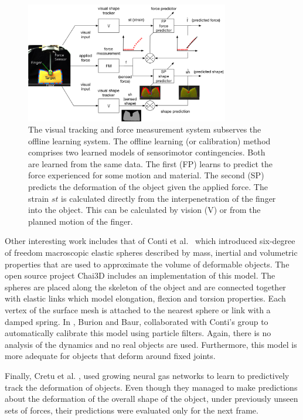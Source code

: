 \documentclass[journal]{IEEEtran}
\begin{document}
\begin{figure}[!t]
\centering
\includegraphics[width=3.5in]{figures/learning}%
\caption{The visual tracking and force measurement system subserves the offline learning system. The offline learning (or calibration) method comprises two learned models of sensorimotor contingencies. Both are learned from the same data. The first (FP) learns to predict the force experienced for some motion and material. The second (SP) predicts the deformation of the object given the applied force. The strain $st$ is calculated directly from the interpenetration of the finger into the object. This can be calculated by vision (V) or from the planned motion of the finger.}
\label{fig:learning}
\end{figure}

Other interesting work includes that of Conti et al.\ \cite{Conti2003} which introduced six-degree of freedom macroscopic elastic spheres described by mass, inertial and volumetric properties that are used to approximate the volume of deformable objects. The open source project Chai3D includes an implementation of this model. The spheres are placed along the skeleton of the object and are connected together with elastic links which model elongation, flexion and torsion properties. Each vertex of the surface mesh is attached to the nearest sphere or link with a damped spring.  In \cite{Burion2008}, Burion and Baur, collaborated with Conti's group to automatically calibrate this model using particle filters.  Again, there is no analysis of the dynamics and no real objects are used.  Furthermore, this model is more adequate for objects that deform around fixed joints.

Finally, Cretu et al. \cite{Cretu2012}, used growing neural gas networks to learn to predictively track the deformation of objects.  Even though they managed to make predictions about the deformation of the overall shape of the object, under previously unseen sets of forces, their predictions were evaluated only for the next frame.
\end{document}
